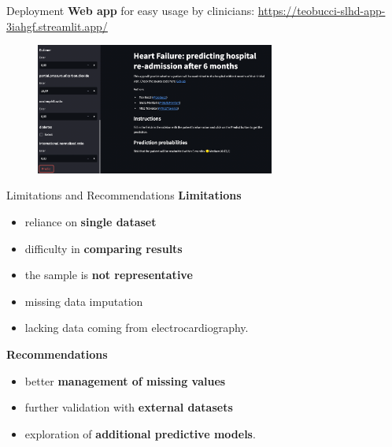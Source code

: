 \documentclass[aspectratio=169,xcolor=dvipsnames]{beamer}
\begin{document}
\begin{frame}{Deployment}
    \textbf{Web app} for easy usage by clinicians:
    {\scriptsize\url{https://teobucci-slhd-app-3iahgf.streamlit.app/}}
    \begin{figure}[htpb]
        \centering
        \includegraphics[width=0.7\textwidth]{webapp}
    \end{figure}
\end{frame}



\begin{frame}{Limitations and Recommendations}
\textbf{Limitations}
\begin{itemize}
  \item reliance on \textbf{single dataset}
  \item difficulty in \textbf{comparing results}
  \item the sample is \textbf{not representative}
  \item missing data imputation
  \item lacking data coming from electrocardiography.
\end{itemize}
\pause
\textbf{Recommendations}
\begin{itemize}
  \item better \textbf{management of missing values}
  \item further validation with \textbf{external datasets}
  \item exploration of \textbf{additional predictive models}.
\end{itemize}
\end{frame}
\end{document}
